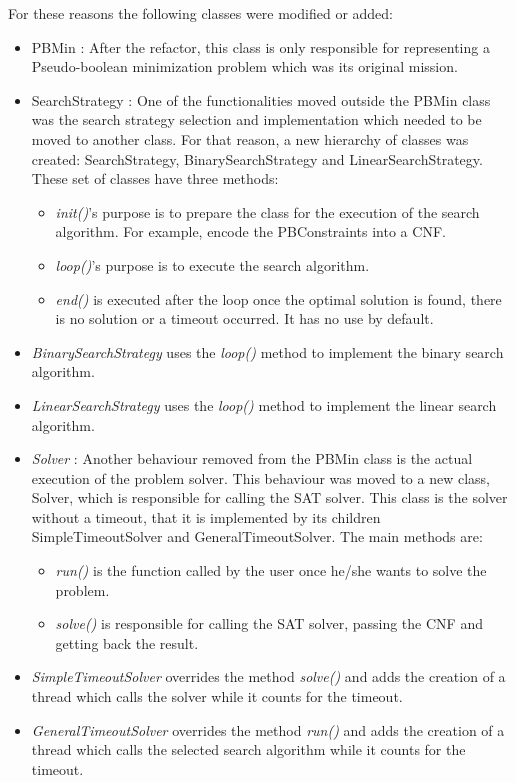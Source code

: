 For these reasons the following classes were modified or added: 
\begin{itemize}
	\item PBMin : After the refactor, this class is only responsible for representing a Pseudo-boolean minimization problem which was its original mission.
	\item SearchStrategy : One of the functionalities moved outside the PBMin class was the search strategy selection and implementation which needed to be moved to another class. For that reason, a new hierarchy of classes was created: SearchStrategy, BinarySearchStrategy and LinearSearchStrategy.  These set of classes have three methods: 
	\begin{itemize}
		\item \emph{init()}'s purpose is to prepare the class for the execution of the search algorithm. For example, encode the PBConstraints   into a CNF. 
		\item \emph{loop()}'s purpose is to execute the search algorithm.  
		\item \emph{end()} is executed after the loop once the optimal solution is found, there is no solution or a timeout occurred. It has no use by default.  
	\end{itemize}
	\item \emph{BinarySearchStrategy} uses the \emph{loop()} method to implement the binary search algorithm. 
	\item \emph{LinearSearchStrategy} uses the \emph{loop()} method to implement the linear search algorithm. 
	\item \emph{Solver} : Another behaviour removed from the PBMin class is the actual execution of the problem solver. This behaviour was moved to a new class, Solver, which is responsible for calling the SAT solver. This class is the solver without a timeout, that it is implemented by its children SimpleTimeoutSolver and GeneralTimeoutSolver. The main methods are: 
	\begin{itemize}
		\item \emph{run()} is the function called by the user once he/she wants to solve the problem.
		\item \emph{solve()} is responsible for calling the SAT solver, passing the CNF and getting back the result. 
	\end{itemize}
	\item \emph{SimpleTimeoutSolver} overrides the method \emph{solve()} and adds the creation of a thread which calls the solver while it counts for the timeout.  
	\item \emph{GeneralTimeoutSolver} overrides the method \emph{run()} and adds the creation of a thread which calls the selected search algorithm while it counts for the timeout. 
\end{itemize}  

